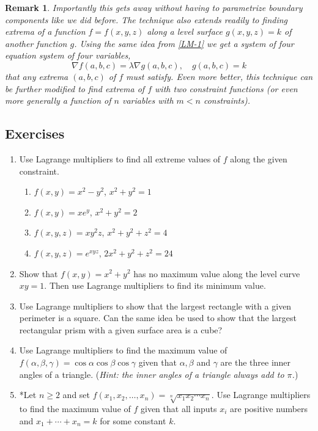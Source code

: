 \documentclass[12pt]{article}
\numberwithin{equation}{subsection}
\numberwithin{figure}{subsection}
\theoremstyle{note}
\newtheorem{remark}[subsection]{Remark}
\begin{document}
{\begin{remark}Importantly this gets away without having to parametrize boundary components like we did before. The technique also extends readily to finding extrema of a function $f=f(x,y,z)$ along a level \textit{surface} $g(x,y,z)=k$ of another function $g$. Using the same idea from \eqref{LM-1} we get a system of \textit{four} equation system of four variables, \[\nabla f(a,b,c)=\lambda \nabla g(a,b,c), \quad g(a,b,c)=k\] that any extrema $(a,b,c)$ of $f$ must satisfy. Even more better, this technique can be further modified to find extrema of $f$ with two constraint functions (or even more generally a function of $n$ variables with $m<n$ constraints).\end{remark}

\subsection{Exercises}
\begin{enumerate}[label=\arabic*.]
\item Use Lagrange multipliers to find all extreme values of $f$ along the given constraint.

\begin{enumerate}
	\item $f(x,y)=x^2-y^2$, $x^2+y^2=1$
	\item $f(x,y)=xe^y$, $x^2+y^2=2$
	\item $f(x,y,z)=xy^2z$, $x^2+y^2+z^2=4$
	\item $f(x,y,z)=e^{xyz}$, $2x^2+y^2+z^2=24$
\end{enumerate}

\item Show that $f(x,y)=x^2+y^2$ has no maximum value along the level curve $xy=1$. Then use Lagrange multipliers to find its minimum value.

\item Use Lagrange multipliers to show that the largest rectangle with a given perimeter is a square. Can the same idea be used to show that the largest rectangular prism with a given surface area is a cube?

\item Use Lagrange multipliers to find the maximum value of $f(\alpha, \beta,\gamma)=\cos \alpha \cos\beta \cos\gamma$ given that $\alpha, \beta$ and $\gamma$ are the three inner angles of a triangle. (\textit{Hint: the inner angles of a triangle always add to $\pi$.})

\item *Let $n\geq 2$ and set $f(x_1,x_2,\dots, x_n)=\sqrt[n]{x_1x_2\cdots x_n}$. Use Lagrange multipliers to find the maximum value of $f$ given that all inputs $x_i$ are positive numbers and $x_1+\cdots+x_n=k$ for some constant $k$. 


\end{enumerate}}
\end{document}
